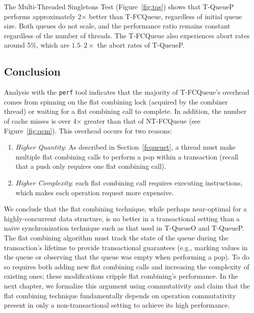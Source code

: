 The Multi-Threaded Singletons Test (Figure~\ref{fig:tqs}) shows that T-QueueP performs approximately 2$\times$ better than T-FCQueue, regardless of initial queue size. Both queues do not scale, and the performance ratio remains constant regardless of the number of threads. The T-FCQueue also experiences abort rates around 5\%, which are $1.5$--$2\times$ the abort rates of T-QueueP.

\vspace{12pt}
\noindent{}

\subsection{Conclusion}
Analysis with the \texttt{perf} tool indicates that the majority of T-FCQueue's overhead comes from spinning on the flat combining lock (acquired by the combiner thread) or waiting for a flat combining call to complete. In addition, the number of cache misses is over 4$\times$ greater than that of NT-FCQueue (see Figure~\ref{fig:qcm}). This overhead occurs for two reasons:
\begin{enumerate}
    \item \emph{Higher Quantity}: As described in Section~\ref{fcqueuet}, a thread must make multiple flat combining calls to perform a pop within a transaction (recall that a push only requires one flat combining call).
\item \emph{Higher Complexity}: each flat combining call requires executing instructions, which makes each operation request more expensive.
\end{enumerate}

We conclude that the flat combining technique, while perhaps near-optimal for a highly-concurrent data structure, is no better in a transactional setting than a naive synchronization technique such as that used in T-QueueO and T-QueueP. The flat combining algorithm must track the state of the queue during the transaction's lifetime to provide transactional guarantees (e.g., marking values in the queue or observing that the queue was empty when performing a pop). To do so requires both adding new flat combining calls and increasing the complexity of existing ones; these modifications cripple flat combining's performance.
In the next chapter, we formalize this argument using commutativity and claim that the flat combining technique fundamentally depends on operation commutativity present in only a non-transactional setting to achieve its high performance. 
